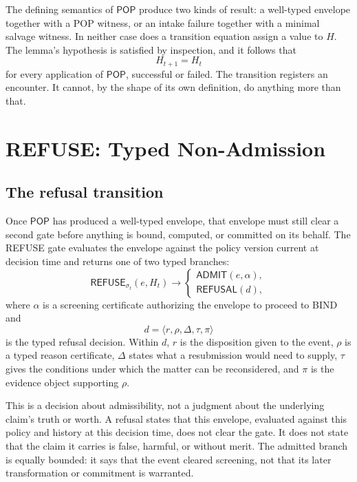 \documentclass[11pt,openany]{book}
\newcommand{\Pop}{\mathsf{POP}}
\newcommand{\Refuse}{\mathsf{REFUSE}}
\begin{document}
The defining semantics of \(\Pop\) produce two kinds of result: a well-typed
envelope together with a POP witness, or an intake failure together with a
minimal salvage witness. In neither case does a transition equation assign a
value to \(H\). The lemma's hypothesis is satisfied by inspection, and it
follows that
\[
 H_{t+1}=H_t
\]
for every application of \(\Pop\), successful or failed. The transition
registers an encounter. It cannot, by the shape of its own definition, do
anything more than that.

\chapter{REFUSE: Typed Non-Admission}
\section{The refusal transition}

Once \(\Pop\) has produced a well-typed envelope, that envelope must still
clear a second gate before anything is bound, computed, or committed on its
behalf. The REFUSE gate evaluates the envelope against the policy version
current at decision time and returns one of two typed branches:
\[
 \Refuse_{\sigma_t}(e,H_t)\longrightarrow
 \begin{cases}
   \mathsf{ADMIT}(e,\alpha),\\
   \mathsf{REFUSAL}(d),
 \end{cases}
\]
where \(\alpha\) is a screening certificate authorizing the envelope to
proceed to BIND and
\[
 d=\langle r,\rho,\Delta,\tau,\pi\rangle
\]
is the typed refusal decision. Within \(d\), \(r\) is the disposition given to
the event, \(\rho\) is a typed reason certificate, \(\Delta\) states what a
resubmission would need to supply, \(\tau\) gives the conditions under which
the matter can be reconsidered, and \(\pi\) is the evidence object supporting
\(\rho\).

This is a decision about admissibility, not a judgment about the underlying
claim's truth or worth. A refusal states that this envelope, evaluated against
this policy and history at this decision time, does not clear the gate. It does
not state that the claim it carries is false, harmful, or without merit. The
admitted branch is equally bounded: it says that the event cleared screening,
not that its later transformation or commitment is warranted.
\end{document}
